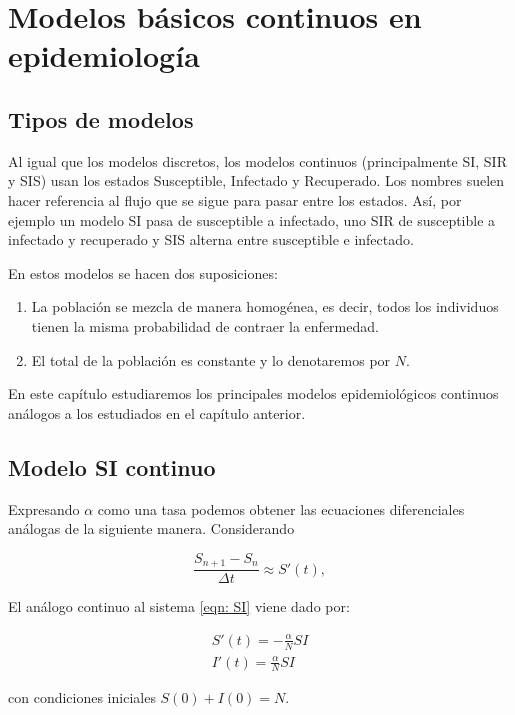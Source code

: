 \chapter{Modelos básicos continuos en epidemiología}

\section{Tipos de modelos}

Al igual que los modelos discretos, los modelos continuos (principalmente SI, SIR y SIS) usan los estados Susceptible, Infectado y Recuperado. Los nombres suelen hacer referencia al flujo que se sigue para pasar entre los estados. Así, por ejemplo un modelo SI pasa de susceptible a infectado, uno SIR de susceptible a infectado y recuperado y SIS alterna entre susceptible e infectado.

En estos modelos se hacen dos suposiciones:
\begin{enumerate}
\item La población se mezcla de manera homogénea, es decir, todos los individuos tienen la misma probabilidad de contraer la enfermedad.
\item El total de la población es constante y lo denotaremos por $N$.
\end{enumerate}

En este capítulo estudiaremos los principales modelos epidemiológicos continuos análogos a los estudiados en el capítulo anterior.


\section{Modelo SI continuo}

Expresando $\alpha$ como una tasa podemos obtener las ecuaciones diferenciales análogas de la siguiente manera. Considerando

$$\frac{S_{n+1} - S_n}{\Delta t} \approx S'(t),$$

El análogo continuo al sistema \eqref{eqn: SI} viene dado por:

\begin{equation}
\label{eqn:SI_continuo}
\begin{aligned}
S'(t) = -\frac{\alpha}{N}SI \\
I'(t) = \frac{\alpha}{N}SI
\end{aligned}
\end{equation}

con condiciones iniciales $S(0)+I(0)=N$.

